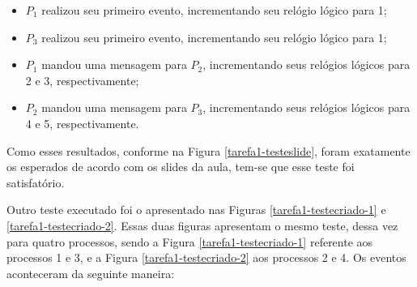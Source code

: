 \documentclass[conference]{IEEEtran}
\begin{document}
\begin{itemize}
\item $P_1$ realizou seu primeiro evento, incrementando seu relógio lógico para 1;
\item $P_3$ realizou seu primeiro evento, incrementando seu relógio lógico para 1;
\item $P_1$ mandou uma mensagem para $P_2$, incrementando seus relógios lógicos para 2 e 3, respectivamente;
\item $P_2$ mandou uma mensagem para $P_3$, incrementando seus relógios lógicos para 4 e 5, respectivamente.
\end{itemize}

	Como esses resultados, conforme na Figura \ref{tarefa1-testeslide}, foram exatamente os esperados de acordo com os slides da aula, tem-se que esse teste foi satisfatório.
	
	
	Outro teste executado foi o apresentado nas Figuras \ref{tarefa1-testecriado-1} e \ref{tarefa1-testecriado-2}. Essas duas figuras apresentam o mesmo teste, dessa vez para quatro processos, sendo a Figura \ref{tarefa1-testecriado-1} referente aos processos 1 e 3, e a Figura \ref{tarefa1-testecriado-2} aos processos 2 e 4. Os eventos aconteceram da seguinte maneira:
	
\end{document}
